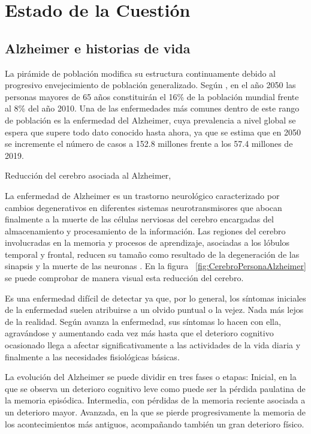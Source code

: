 \chapter{Estado de la Cuestión}
\label{cap:estadoDeLaCuestion}


\section{Alzheimer e historias de vida}
La pirámide de población modifica su estructura continuamente debido al progresivo envejecimiento de población generalizado. Según \cite{estalz}, en el año 2050 las personas mayores de 65 años constituirán el 16\% de la población mundial frente al 8\%  del año 2010. Una de las enfermedades más comunes dentro de este rango de población es la enfermedad del Alzheimer, cuya prevalencia a nivel global se espera que supere todo dato conocido hasta ahora, ya que se estima que en 2050 se incremente el número de casos a 152.8 millones frente a los 57.4 millones de 2019. 

%
{Reducción del cerebro asociada al Alzheimer, \citet{mattson2004pathways}}

La enfermedad de Alzheimer es un trastorno neurológico caracterizado por cambios degenerativos en diferentes sistemas neurotransmisores que abocan finalmente a la muerte de las células nerviosas del cerebro encargadas del almacenamiento y procesamiento de la información. Las regiones del cerebro involucradas en la memoria y procesos de aprendizaje, asociadas a los lóbulos temporal y frontal, reducen su tamaño como resultado de la degeneración de las sinapsis y la muerte de las neuronas \citep{romano2007enfermedad,mattson2004pathways}. En la figura ~\ref{fig:CerebroPersonaAlzheimer} se puede comprobar de manera visual esta reducción del cerebro.

Es una enfermedad difícil de detectar ya que, por lo general, los síntomas iniciales de la enfermedad suelen atribuirse a un olvido puntual o la vejez. Nada más lejos de la realidad. Según avanza la enfermedad, sus síntomas lo hacen con ella, agravándose y aumentando cada vez más hasta que el deterioro cognitivo ocasionado llega a afectar significativamente a las actividades de la vida diaria y finalmente a las necesidades fisiológicas básicas.

La evolución del Alzheimer se puede dividir en tres fases o etapas: Inicial, en la que se observa un deterioro cognitivo leve como puede ser la pérdida paulatina de la memoria episódica. Intermedia, con pérdidas de la memoria reciente asociada a un deterioro mayor. Avanzada, en la que se pierde progresivamente la memoria de los acontecimientos más antiguos, acompañando también un gran deterioro físico.

